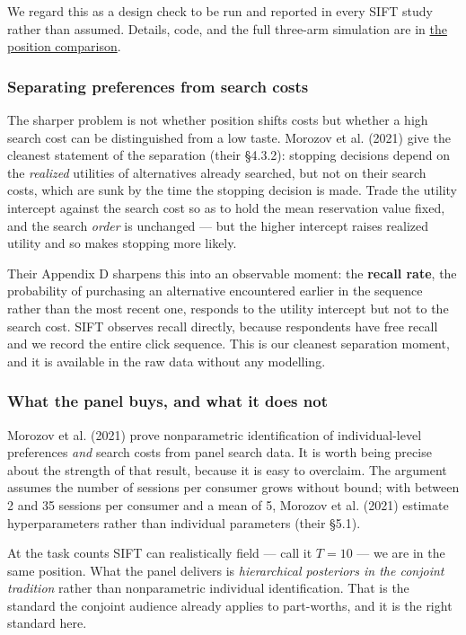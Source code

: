 \documentclass[
  letterpaper,
  DIV=11,
  numbers=noendperiod]{scrartcl}
\begin{document}
We regard this as a design check to be run and reported in every SIFT
study rather than assumed. Details, code, and the full three-arm
simulation are in \href{../comparisons/compare-ursu-position.qmd}{the
position comparison}.

\subsubsection{Separating preferences from search
costs}\label{separating-preferences-from-search-costs}

The sharper problem is not whether position shifts costs but whether a
high search cost can be distinguished from a low taste. Morozov et al.
(2021) give the cleanest statement of the separation (their §4.3.2):
stopping decisions depend on the \emph{realized} utilities of
alternatives already searched, but not on their search costs, which are
sunk by the time the stopping decision is made. Trade the utility
intercept against the search cost so as to hold the mean reservation
value fixed, and the search \emph{order} is unchanged --- but the higher
intercept raises realized utility and so makes stopping more likely.

Their Appendix D sharpens this into an observable moment: the
\textbf{recall rate}, the probability of purchasing an alternative
encountered earlier in the sequence rather than the most recent one,
responds to the utility intercept but not to the search cost. SIFT
observes recall directly, because respondents have free recall and we
record the entire click sequence. This is our cleanest separation
moment, and it is available in the raw data without any modelling.

\subsubsection{What the panel buys, and what it does
not}\label{what-the-panel-buys-and-what-it-does-not}

Morozov et al. (2021) prove nonparametric identification of
individual-level preferences \emph{and} search costs from panel search
data. It is worth being precise about the strength of that result,
because it is easy to overclaim. The argument assumes the number of
sessions per consumer grows without bound; with between 2 and 35
sessions per consumer and a mean of 5, Morozov et al. (2021) estimate
hyperparameters rather than individual parameters (their §5.1).

At the task counts SIFT can realistically field --- call it \(T=10\) ---
we are in the same position. What the panel delivers is
\emph{hierarchical posteriors in the conjoint tradition} rather than
nonparametric individual identification. That is the standard the
conjoint audience already applies to part-worths, and it is the right
standard here.
\end{document}
